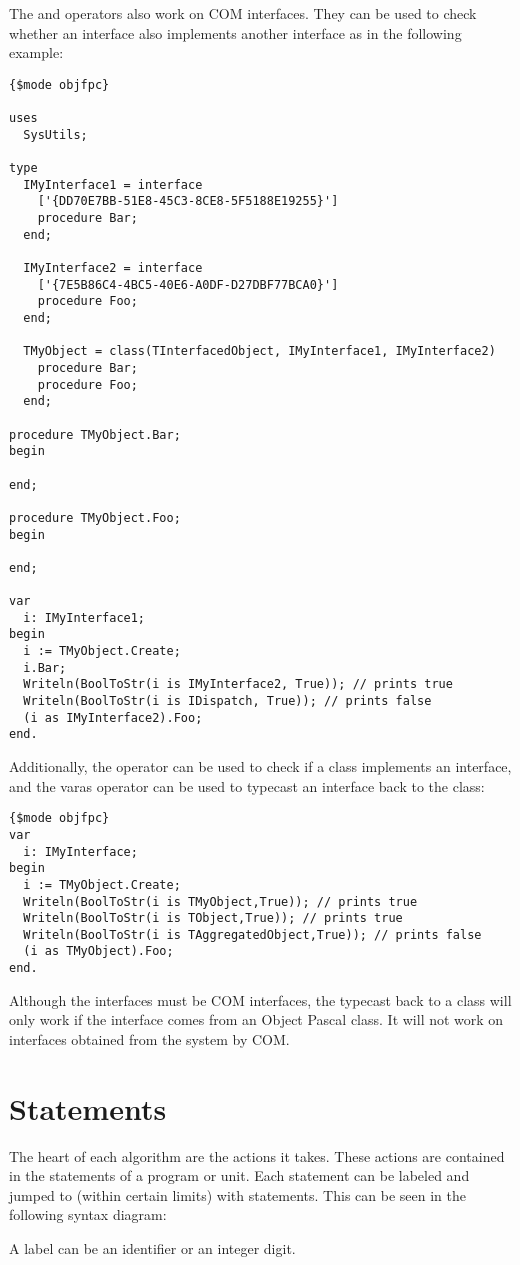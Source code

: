 The  and  operators also work on COM interfaces. They can be
used to check whether an interface also implements another interface as in
the following example:
\begin{verbatim}
{$mode objfpc}

uses
  SysUtils;

type
  IMyInterface1 = interface
    ['{DD70E7BB-51E8-45C3-8CE8-5F5188E19255}']
    procedure Bar;
  end;

  IMyInterface2 = interface
    ['{7E5B86C4-4BC5-40E6-A0DF-D27DBF77BCA0}']
    procedure Foo;
  end;

  TMyObject = class(TInterfacedObject, IMyInterface1, IMyInterface2)
    procedure Bar;
    procedure Foo;
  end;

procedure TMyObject.Bar;
begin

end;

procedure TMyObject.Foo;
begin

end;

var
  i: IMyInterface1;
begin
  i := TMyObject.Create;
  i.Bar;
  Writeln(BoolToStr(i is IMyInterface2, True)); // prints true
  Writeln(BoolToStr(i is IDispatch, True)); // prints false
  (i as IMyInterface2).Foo;
end.
\end{verbatim}

Additionally, the  operator can be used to check if a class
implements an interface, and the var{as} operator can be used to typecast an
interface back to the class:
\begin{verbatim}
{$mode objfpc}
var
  i: IMyInterface;
begin
  i := TMyObject.Create;
  Writeln(BoolToStr(i is TMyObject,True)); // prints true
  Writeln(BoolToStr(i is TObject,True)); // prints true
  Writeln(BoolToStr(i is TAggregatedObject,True)); // prints false
  (i as TMyObject).Foo;
end.
\end{verbatim}
Although the interfaces must be COM interfaces, the typecast back to a 
class will only work if the interface comes from an Object Pascal class. 
It will not work on interfaces obtained from the system by COM.

\chapter{Statements}
\label{ch:Statements}
The heart of each algorithm are the actions it takes. These actions are
contained in the statements of a program or unit. Each statement can be
labeled and jumped to (within certain limits) with  statements.
This can be seen in the following syntax diagram:

A label can be an identifier or an integer digit.


